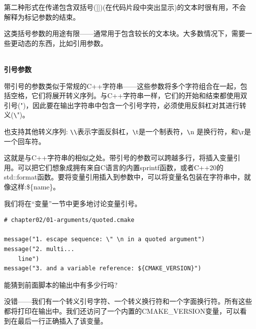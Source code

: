 
第二种形式在传递包含双括号(]])(在代码片段中突出显示)的文本时很有用，不会解释为标记参数的结束。

这类括号参数的用途有限——通常用于包含较长的文本块。大多数情况下，需要一些更动态的东西，比如引用参数。

\hspace*{\fill} \\ %
\noindent
\textbf{引号参数}

带引号的参数类似于常规的C++字符串——这些参数将多个字符组合在一起，包括空格，它们将展开转义序列。与C++字符串一样，它们的开始和结束都使用双引号(")，因此要在输出字符串中包含一个引号字符，必须使用反斜杠对其进行转义(\verb|\|")。

也支持其他转义序列: \verb|\|\verb|\|表示字面反斜杠，\verb|\|t是一个制表符，\verb|\|n 是换行符，和\verb|\|r是一个回车符。

这就是与C++字符串的相似之处。带引号的参数可以跨越多行，将插入变量引用。可以把它们想象成拥有来自C语言的内置sprintf函数，或者C++20的std::format函数。要将变量引用插入到参数中，可以将变量名包装在字符串中，就像这样:\$\{name\}。

我们将在“变量”一节中更多地讨论变量引号。

\begin{lstlisting}[style=styleCMake]
# chapter02/01-arguments/quoted.cmake
	
message("1. escape sequence: \" \n in a quoted argument")
message("2. multi...
	line")
message("3. and a variable reference: ${CMAKE_VERSION}")
\end{lstlisting}

能猜到前面脚本的输出中有多少行吗?


没错——我们有一个转义引号字符、一个转义换行符和一个字面换行符。所有这些都将打印在输出中。我们还访问了一个内置的CMAKE\_VERSION变量，可以看到在最后一行正确插入了该变量。

